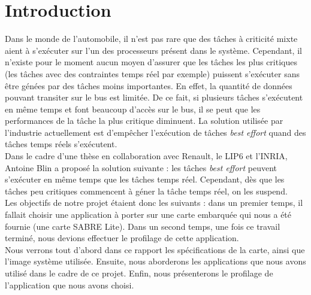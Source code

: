 \section*{Introduction}

Dans le monde de l'automobile, il n'est pas rare que des tâches à criticité 
mixte aient à s'exécuter sur l'un des processeurs présent dans le système. 
Cependant, il n'existe pour le moment aucun moyen d'assurer que les tâches les 
plus critiques (les tâches avec des contraintes temps réel par exemple) puissent
s'exécuter sans être génées par des tâches moins importantes. En effet, la 
quantité de données pouvant transiter sur le bus est limitée. De ce fait, si 
plusieurs tâches s'exécutent en même temps et font beaucoup d'accès sur le bus, 
il se peut que les performances de la tâche la plus critique diminuent. La 
solution utilisée par l'industrie actuellement est d'empêcher l'exécution de 
tâches \textit{best effort} quand des tâches temps réels s'exécutent. \\

Dans le cadre d'une thèse en collaboration avec Renault, le LIP6 et l'INRIA, 
Antoine Blin a proposé la solution suivante : les tâches 
\textit{best effort} peuvent 
s'exécuter en même temps que les tâches temps réel. Cependant, dès que les 
tâches peu critiques commencent à géner la tâche temps réel, on les suspend.\\

Les objectifs de notre projet étaient donc les suivants : dans un premier temps,
il fallait choisir une application à porter sur une carte embarquée qui nous a 
été fournie (une carte SABRE Lite). Dans un second temps, une fois ce travail 
terminé, nous devions effectuer le profilage de cette application. \\

Nous verrons tout d'abord dans ce rapport les spécifications de la carte, ainsi
que l'image système utilisée. Ensuite, nous aborderons les applications que nous
avons utilisé dans le cadre de ce projet. Enfin, nous présenterons le profilage de
l'application que nous avons choisi.
